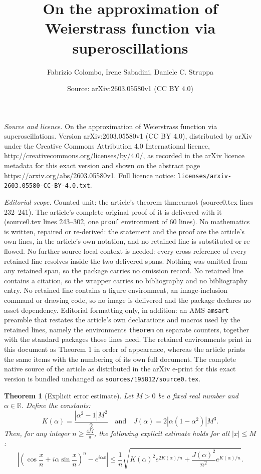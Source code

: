 \documentclass[10pt,a4paper]{amsart}
\title{On the approximation of Weierstrass function via superoscillations}
\author{Fabrizio Colombo, Irene Sabadini, Daniele C. Struppa}
\date{Source: arXiv:2603.05580v1 (CC BY 4.0)}
\newtheorem{theorem}{Theorem}
\begin{document}
\maketitle

\noindent\emph{Source and licence.} On the approximation of Weierstrass function via superoscillations. Version arXiv:2603.05580v1 (CC BY 4.0), distributed by arXiv under the Creative Commons Attribution 4.0 International licence, http://creativecommons.org/licenses/by/4.0/, as recorded in the arXiv licence metadata for this exact version and shown on the abstract page https://arxiv.org/abs/2603.05580v1. Full licence notice: \texttt{licenses/arxiv-2603.05580-CC-BY-4.0.txt}.\par\smallskip

\noindent\textit{Editorial scope.} Counted unit: the article's theorem thm:carnot (source0.tex lines 232--241). The article's complete original proof of it is delivered with it (source0.tex lines 243--302, one \texttt{proof} environment of 60 lines). No mathematics is written, repaired or re-derived: the statement and the proof are the article's own lines, in the article's own notation, and no retained line is substituted or re-flowed.  No further source-local context is needed: every cross-reference of every retained line resolves inside the two delivered spans.  Nothing was omitted from any retained span, so the package carries no omission record.  No retained line contains a citation, so the wrapper carries no bibliography and no bibliography entry.  No retained line contains a figure environment, an image-inclusion command or drawing code, so no image is delivered and the package declares no asset dependency.  Editorial formatting only, in addition: an AMS \texttt{amsart} preamble that restates the article's own declarations and macros used by the retained lines, namely the environments \texttt{theorem} on separate counters, together with the standard packages those lines need.  The retained environments print in this document as Theorem 1 in order of appearance, whereas the article prints the same items with the numbering of its own full document.  The complete native source of the article as distributed in the arXiv e-print for this exact version is bundled unchanged as \texttt{sources/195812/source0.tex}.
\begin{theorem}[Explicit error estimate] \label{thm:carnot}
Let $M > 0$ be a fixed real number and $\alpha \in \mathbb{R}$. Define the constants:
\[
    K(\alpha) = \frac{|\alpha^2-1|M^2}{2} \quad \text{and} \quad J(\alpha) = 2|\alpha(1-\alpha^2)|M^3.
\]
Then, for any integer $n \ge \frac{4M}{\pi}$, the following explicit estimate holds for all $|x| \le M$:
\begin{equation}
    \left| \left( \cos\frac{x}{n} + i \alpha \sin\frac{x}{n} \right)^n - e^{i \alpha x} \right| \leq \frac{1}{n} \sqrt{ K(\alpha)^2 e^{2K(\alpha)/n} + \frac{J(\alpha)^2}{n^2} e^{K(\alpha)/n} }.
\end{equation}
\end{theorem}
\end{document}
